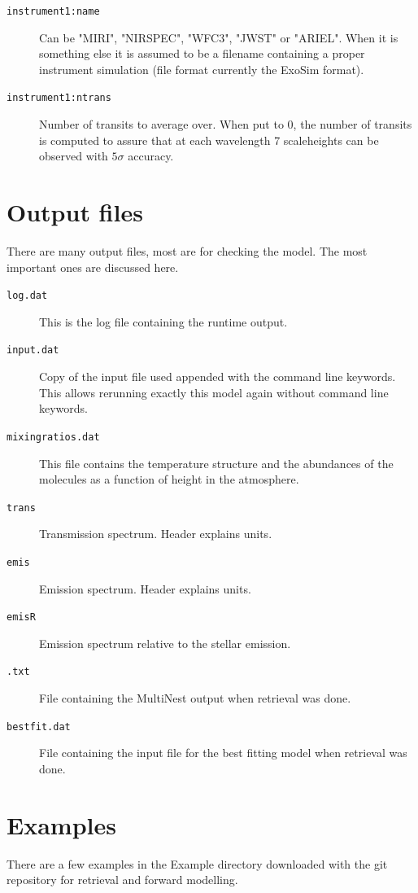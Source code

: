 \documentclass[12pt]{article}
\begin{document}
\begin{description}

\item[\texttt{instrument1:name}]
Can be "MIRI", "NIRSPEC", "WFC3", "JWST" or "ARIEL". When it is something else it is assumed to be a filename containing a proper instrument simulation (file format currently the ExoSim format).
\item[\texttt{instrument1:ntrans}]
Number of transits to average over. When put to $0$, the number of transits is computed to assure that at each wavelength 7 scaleheights can be observed with $5\sigma$ accuracy.
\end{description}

\section{Output files}

There are many output files, most are for checking the model. The most important ones are discussed here.

\begin{description}
\item[\texttt{log.dat}]
This is the log file containing the runtime output.
\item[\texttt{input.dat}]
Copy of the input file used appended with the command line keywords. This allows rerunning exactly this model again without command line keywords.
\item[\texttt{mixingratios.dat}]
This file contains the temperature structure and the abundances of the molecules as a function of height in the atmosphere.
\item[\texttt{trans}]
Transmission spectrum. Header explains units.
\item[\texttt{emis}]
Emission spectrum. Header explains units.
\item[\texttt{emisR}]
Emission spectrum relative to the stellar emission.
\item[\texttt{.txt}]
File containing the MultiNest output when retrieval was done.
\item[\texttt{bestfit.dat}]
File containing the input file for the best fitting model when retrieval was done.
\end{description}

\section{Examples}

There are a few examples in the Example directory downloaded with the git repository for retrieval and forward modelling.

\end{document}
